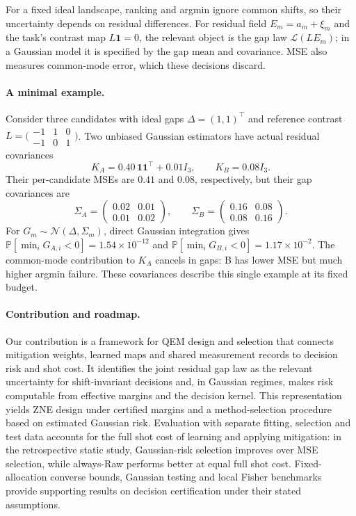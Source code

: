 \documentclass[a4paper,onecolumn,unpublished,nopdfoutputerror]{quantumarticle}
\theoremstyle{plain}
\theoremstyle{definition}
\newcommand{\Prob}{\mathbb{P}}
\newcommand{\calN}{\mathcal{N}}
\newcommand{\1}{\mathbf{1}}
\begin{document}
For a fixed ideal landscape, ranking and argmin ignore common shifts, so their uncertainty depends on residual differences. For residual field $E_m=a_m+\xi_m$ and the task's contrast map $L\1=0$, the relevant object is the gap law $\mathcal L(LE_m)$; in a Gaussian model it is specified by the gap mean and covariance. MSE also measures common-mode error, which these decisions discard.

\paragraph{A minimal example.}
Consider three candidates with ideal gaps $\Delta=(1,1)^\top$ and reference contrast $L=\bigl(\begin{smallmatrix}-1&1&0\\-1&0&1\end{smallmatrix}\bigr)$. Two unbiased Gaussian estimators have actual residual covariances
\[
K_A=0.40\,\1\1^\top+0.01I_3,\qquad K_B=0.08I_3.
\]
Their per-candidate MSEs are $0.41$ and $0.08$, respectively, but their gap covariances are
\[
\Sigma_A=\begin{pmatrix}0.02&0.01\\0.01&0.02\end{pmatrix},
\qquad
\Sigma_B=\begin{pmatrix}0.16&0.08\\0.08&0.16\end{pmatrix}.
\]
For $G_m\sim\calN(\Delta,\Sigma_m)$, direct Gaussian integration gives $\Prob[\min_iG_{A,i}<0]=1.54\times10^{-12}$ and $\Prob[\min_iG_{B,i}<0]=1.17\times10^{-2}$. The common-mode contribution to $K_A$ cancels in gaps: B has lower MSE but much higher argmin failure. These covariances describe this single example at its fixed budget.

\paragraph{Contribution and roadmap.}
Our contribution is a framework for QEM design and selection that connects mitigation weights, learned maps and shared measurement records to decision risk and shot cost. It identifies the joint residual gap law as the relevant uncertainty for shift-invariant decisions and, in Gaussian regimes, makes risk computable from effective margins and the decision kernel. This representation yields ZNE design under certified margins and a method-selection procedure based on estimated Gaussian risk. Evaluation with separate fitting, selection and test data accounts for the full shot cost of learning and applying mitigation: in the retrospective static study, Gaussian-risk selection improves over MSE selection, while always-Raw performs better at equal full shot cost. Fixed-allocation converse bounds, Gaussian testing and local Fisher benchmarks provide supporting results on decision certification under their stated assumptions.
\end{document}
